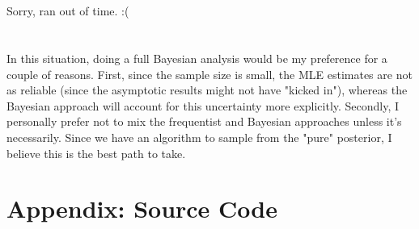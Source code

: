 \documentclass[11pt]{article}
\renewcommand\;{\,}
\begin{document}
\section{} Sorry, ran out of time. :(

\section{}

\section{}
In this situation, doing a full Bayesian analysis would be my preference for a couple of reasons. First, since the sample size is small, the MLE estimates are not as reliable (since the asymptotic results might not have "kicked in"), whereas the Bayesian approach will account for this uncertainty more explicitly. Secondly, I personally prefer not to mix the frequentist and Bayesian approaches unless it's necessarily. Since we have an algorithm to sample from the "pure" posterior, I believe this is the best path to take.

\section*{Appendix: Source Code}

\end{document}
